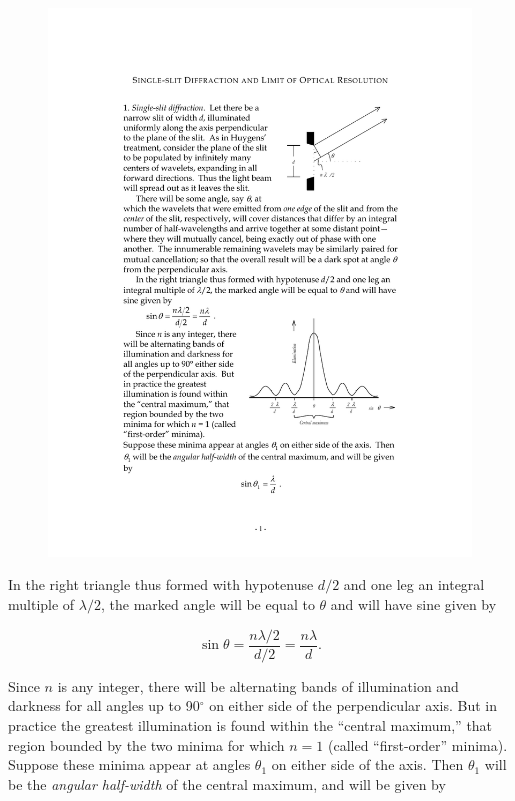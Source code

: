 \documentclass{article}
\begin{document}
\begin{figure}
\includegraphics{Figure2SSD.pdf}
\end{figure}
In the right triangle thus formed with hypotenuse $d/2$ and one leg
an integral multiple of $\lambda/2$, the marked angle will be equal to
$\theta$ and will have sine given by

\begin{equation*}
\sin \theta = \frac{n\lambda/2}{d/2} = \frac{n\lambda}{d}.
\end{equation*}

Since $n$ is any integer, there will be alternating bands of
illumination and darkness for all angles up to 90$^\circ$ on either side of the
perpendicular axis. But in practice the greatest illumination is found
within the ``central maximum,'' that region bounded by the two minima
for which $n = 1$ (called ``first-order'' minima). Suppose these
minima appear at angles $\theta_1$ on either side of the axis. Then
$\theta_1$ will be the \emph{angular half-width} of the central maximum,
and will be given by
\end{document}

